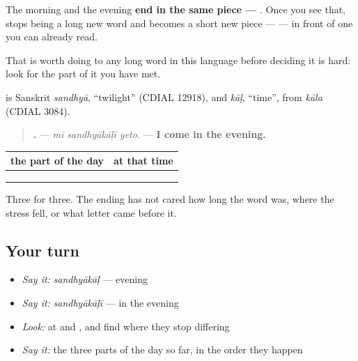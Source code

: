The morning and the evening \textbf{end in the same piece — }. Once you see that,  stops being a long new word and becomes a short new piece — \textbf{} — in front of one you can already read.

That is worth doing to any long word in this language before deciding it is hard: look for the part of it you have met.

\begin{cousinweb}
\textbf{} is Sanskrit \emph{sandhyā}, \textquotedblleft{}twilight\textquotedblright{} (CDIAL 12918), and \emph{kāḷ}, \textquotedblleft{}time\textquotedblright{}, from \emph{kāla} (CDIAL 3084).
\end{cousinweb}

\begin{grammarlens}[title={Grammar Lens: third time, same ending}]
\begin{quote}
\textbf{  .} — \emph{mī sandhyākāḷī yeto.} — \textbf{I come in the evening.}
\end{quote}

\noindent
\begin{tabularx}{\linewidth}{@{}>{\raggedright\arraybackslash}X>{\raggedright\arraybackslash}X@{}}
\toprule
\textbf{the part of the day} & \textbf{at that time} \\
\midrule
\textbf{\mr{सकाळ}} & \textbf{\mr{सकाळी}} \\
\textbf{\mr{दुपार}} & \textbf{\mr{दुपारी}} \\
\textbf{\mr{संध्याकाळ}} & \textbf{\mr{संध्याकाळी}} \\
\bottomrule
\end{tabularx}

Three for three. The ending has not cared how long the word was, where the stress fell, or what letter came before it.
\end{grammarlens}

\subsection*{Your turn}
\begin{itemize}
\raggedright
  \item \emph{Say it:} \emph{sandhyākāḷ} — evening
  \item \emph{Say it:} \emph{sandhyākāḷī} — in the evening
  \item \emph{Look:} at \textbf{} and \textbf{}, and find where they stop differing
  \item \emph{Say it:} the three parts of the day so far, in the order they happen
\end{itemize}

